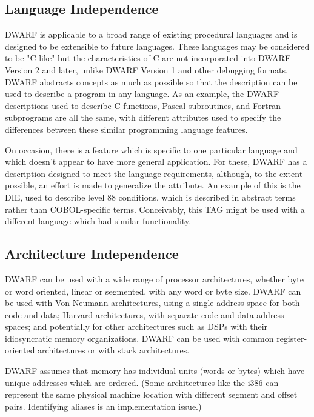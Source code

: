 \subsection{Language Independence}
DWARF is applicable to a broad range of existing procedural 
languages and is designed to be extensible to future languages.  
These languages may be considered to be "C-like" but the 
characteristics of C are not incorporated into DWARF Version 2 
and later, unlike DWARF Version 1 and other debugging formats.  
DWARF abstracts concepts as much as possible so that the 
description can be used to describe a program in any language. 
As an example, the DWARF descriptions used to describe C functions, 
Pascal subroutines, and Fortran subprograms are all the same, 
with different attributes used to specify the differences between 
these similar programming language features. 

On occasion, there is a feature which is specific to one 
particular language and which doesn't appear to have more 
general application.  For these, DWARF has a description 
designed to meet the language requirements, although, to the 
extent possible, an effort is made to generalize the attribute. 
An example of this is the \DWTAGconditionNAME{} DIE, 
\bb\eb 
used to describe  level 88 conditions, which 
is described in abstract terms rather than COBOL-specific terms.  
Conceivably, this TAG might be used with a different language 
which had similar functionality. 

\subsection{Architecture Independence}
DWARF can be used with a wide range of processor architectures, 
whether byte or word oriented, linear or segmented, with any 
word or byte size.  DWARF can be used with Von Neumann architectures, 
using a single address space for both code and data; Harvard 
architectures, with separate code and data address spaces; and 
potentially for other architectures such as DSPs with their 
idiosyncratic memory organizations.  DWARF can be used with 
common register-oriented architectures or with stack architectures. 

DWARF assumes that memory has individual units (words or bytes) 
which have unique addresses which are ordered.  (Some architectures 
like the i386 can represent the same physical machine location with 
different segment and offset pairs.  Identifying aliases is an 
implementation issue.)

